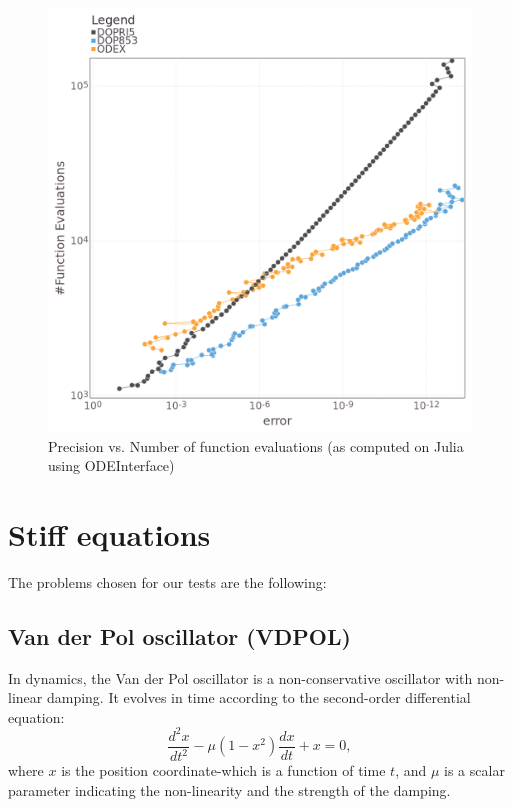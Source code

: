 \documentclass[notitlepage,12pt]{article}
\begin{document}
\begin{figure}[H]
\centering
\includegraphics[scale=0.4]{../ImagesAndPDFs/Plots/RopePrecisionTest.png}
\caption{Precision vs. Number of function evaluations (as computed on Julia using ODEInterface)}
\label{fig:ropeJulia}
\end{figure}

\newpage

\section{Stiff equations}
The problems chosen for our tests are the following:
\label{sec:stiff}

\subsection{Van der Pol oscillator (VDPOL)}
\label{sub:vdpol}
In dynamics, the Van der Pol oscillator is a non-conservative oscillator with non-linear damping. It evolves in time according to the second-order differential equation:
\begin{equation}
\frac{d^2x}{dt^2} -\mu \left(1-x^2 \right)\frac{dx}{dt}+x=0,
\end{equation}
where $x$ is the position coordinate-which is a function of time $t$, and $\mu$ is a scalar parameter indicating the non-linearity and the strength of the damping.
\end{document}
